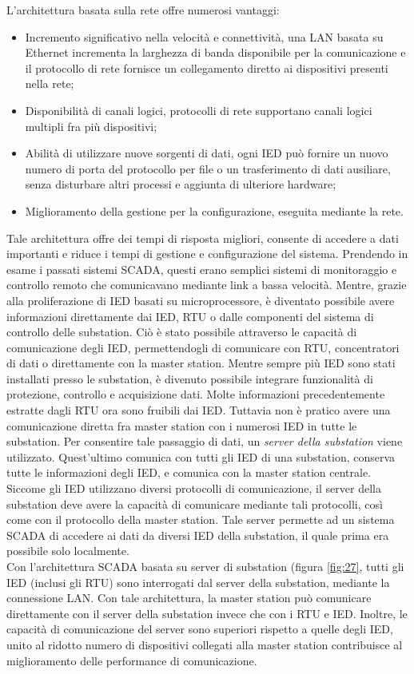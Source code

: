 L'architettura basata sulla rete offre numerosi vantaggi:
\begin{itemize}
	\item Incremento significativo nella velocità e connettività, una LAN basata su Ethernet incrementa la larghezza di banda disponibile per la comunicazione e il protocollo di rete fornisce un collegamento diretto ai dispositivi presenti nella rete;
	\item Disponibilità di canali logici, protocolli di rete supportano canali logici multipli fra più dispositivi;
	\item Abilità di utilizzare nuove sorgenti di dati, ogni IED può fornire un nuovo numero di porta del protocollo per file o un trasferimento di dati ausiliare, senza disturbare altri processi e aggiunta di ulteriore hardware;
	\item Miglioramento della gestione per la configurazione, eseguita mediante la rete.
\end{itemize}
Tale architettura offre dei tempi di risposta migliori, consente di accedere a dati importanti e riduce i tempi di gestione e configurazione del sistema. Prendendo in esame i passati sistemi SCADA, questi erano semplici sistemi di monitoraggio e controllo remoto che comunicavano mediante link a bassa velocità. Mentre, grazie alla proliferazione di IED basati su microprocessore, è diventato possibile avere informazioni direttamente dai IED, RTU o dalle componenti del sistema di controllo delle substation. Ciò è stato possibile attraverso le capacità di comunicazione degli IED, permettendogli di comunicare con RTU, concentratori di dati o direttamente con la master station. Mentre sempre più IED sono stati installati presso le substation, è divenuto possibile integrare funzionalità di protezione, controllo e acquisizione dati. Molte informazioni precedentemente estratte dagli RTU ora sono fruibili dai IED. Tuttavia non è pratico avere una comunicazione diretta fra master station con i numerosi IED in tutte le substation. Per consentire tale passaggio di dati, un \emph{server della substation} viene utilizzato. Quest'ultimo comunica con tutti gli IED di una substation, conserva tutte le informazioni degli IED, e comunica con la master station centrale. Siccome gli IED utilizzano diversi protocolli di comunicazione, il server della substation deve avere la capacità di comunicare mediante tali protocolli, così come con il protocollo della master station. Tale server permette ad un sistema SCADA di accedere ai dati da diversi IED della substation, il quale prima era possibile solo localmente.
\\
Con l'architettura SCADA basata su server di substation (figura \ref{fig:27}, tutti gli IED (inclusi gli RTU) sono interrogati dal server della substation, mediante la connessione LAN. Con tale architettura, la master station può comunicare direttamente con il server della substation invece che con i RTU e IED. Inoltre, le capacità di comunicazione del server sono superiori rispetto a quelle degli IED, unito al ridotto numero di dispositivi collegati alla master station contribuisce al miglioramento delle performance di comunicazione.

